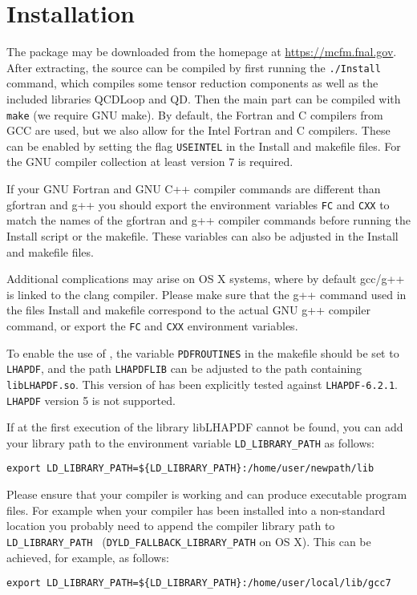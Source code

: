 \section{Installation}
\label{sec:Installation}

The \MCFM{} package may be downloaded from the \MCFM{} homepage at \url{https://mcfm.fnal.gov}.
After extracting, the source can be compiled by first running the
{\tt ./Install} command, which compiles some tensor reduction components
as well as the included libraries QCDLoop and QD. Then the main part can be compiled with {\tt make} (we require GNU 
make).
By default, the Fortran and C compilers from GCC are used, but we also allow for the
Intel Fortran and C compilers. These can be enabled by setting the flag
{\tt USEINTEL} in the Install and makefile files. For the GNU compiler
collection at least version 7 is required.

If your GNU Fortran and GNU C++ compiler commands are different than gfortran
and g++ you should export the environment variables \texttt{FC} and \texttt{CXX} to match the
names of the gfortran and g++ compiler commands before running the Install
script or the makefile. These variables can also be adjusted in the Install and makefile files.

Additional complications may arise on OS X systems, where by default gcc/g++
is linked to the clang compiler. Please make sure that the g++ command used
in the files Install and makefile correspond to the actual GNU g++ compiler command,
or export the \texttt{FC} and \texttt{CXX} environment variables.

To enable the use of \LHAPDF{}, the variable \texttt{PDFROUTINES} in the makefile should be
set to \texttt{LHAPDF}, and the path \texttt{LHAPDFLIB} can be adjusted to the path containing
\texttt{libLHAPDF.so}. This version of \MCFM{} has been 
explicitly tested against {\tt LHAPDF-6.2.1}. \texttt{LHAPDF} version 5 is not supported.

If at the first execution of \MCFM{} the library libLHAPDF cannot be found, you can add your \LHAPDF{} library 
path to the environment variable {\tt LD\_LIBRARY\_PATH} as follows:
\begin{verbatim}
export LD_LIBRARY_PATH=${LD_LIBRARY_PATH}:/home/user/newpath/lib
\end{verbatim}

Please ensure that your compiler is working and can produce executable program
files. For example when your compiler has been installed into a non-standard
location you probably need to append the compiler library path to {\tt
LD\_LIBRARY\_PATH } ({\tt DYLD\_FALLBACK\_LIBRARY\_PATH} on OS X).  This can be
achieved, for example, as follows:
\begin{verbatim}
export LD_LIBRARY_PATH=${LD_LIBRARY_PATH}:/home/user/local/lib/gcc7
\end{verbatim}

